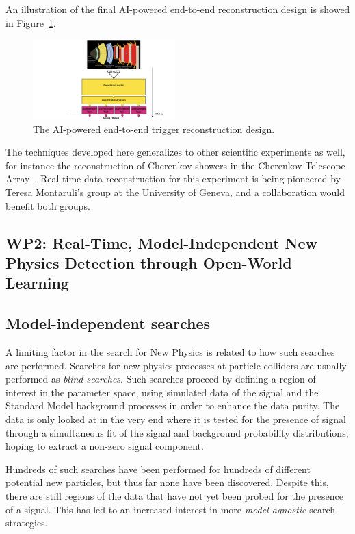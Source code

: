 \documentclass[12pt]{iopart}
\begin{document}
An illustration of the final AI-powered end-to-end reconstruction design is showed in Figure~\ref{fig:e2e}.

\begin{figure}[t!]
    \centering
    \includegraphics[width=0.49\textwidth]{figures/mlpf_foundation.pdf}
    \caption{The AI-powered end-to-end trigger reconstruction design.}
    \label{fig:e2e}
\end{figure}

The techniques developed here generalizes to other scientific experiments as well, for instance the reconstruction of Cherenkov showers in the Cherenkov Telescope Array~\cite{CTAObservatory2024}. Real-time data reconstruction for this experiment is being pioneered by Teresa Montaruli's group at the University of Geneva, and a collaboration would benefit both groups.


\subsection{WP2: Real-Time, Model-Independent New Physics Detection through Open-World Learning}

\subsection{Model-independent searches}
 A limiting factor in the search for New Physics is related to how such searches are performed. Searches for new physics processes at particle colliders are usually performed as \textit{blind searches}. Such searches proceed by defining a region of interest in the parameter space, using simulated data of the signal and the Standard Model background processes in order to enhance the data purity. The data is only looked at in the very end where it is tested for the presence of signal through a simultaneous fit of the signal and background probability distributions, hoping to extract a non-zero signal component.

Hundreds of such searches have been performed for hundreds of different potential new particles, but thus far none have been discovered. Despite this, there are still regions of the data that have not yet been probed for the presence of a signal. This has led to an increased interest in more \textit{model-agnostic} search strategies.
\end{document}
